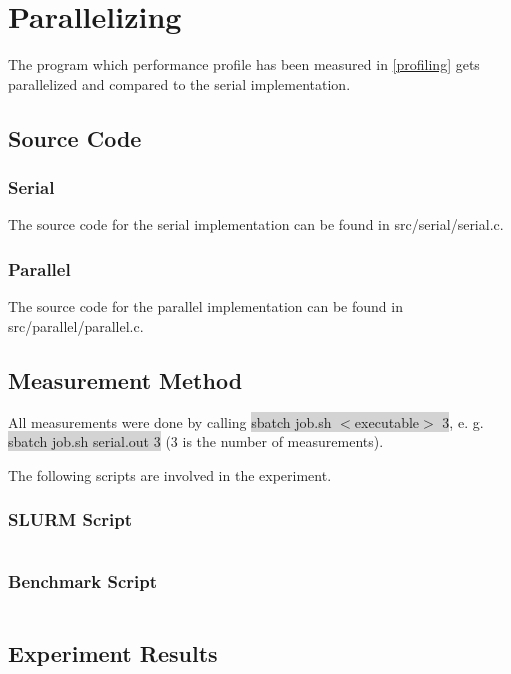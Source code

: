 \documentclass[parskip]{scrartcl}
\begin{document}
	\section{Parallelizing}
	The program which performance profile has been measured in \ref{profiling} gets parallelized and compared to the serial implementation.
	\subsection{Source Code}
	\subsubsection{Serial}
	The source code for the serial implementation can be found in src/serial/serial.c.
	\subsubsection{Parallel}
	The source code for the parallel implementation can be found in src/parallel/parallel.c.
	\subsection{Measurement Method}
	All measurements were done by calling \colorbox{lightgray}{sbatch job.sh $<$executable$>$ 3}, e. g. \colorbox{lightgray}{sbatch job.sh serial.out 3} (3 is the number of measurements).
	
	The following scripts are involved in the experiment.
	\subsubsection{SLURM Script}
	\inputminted[linenos,breaklines]{bash}{src/job.sh}
	\subsubsection{Benchmark Script}
	\inputminted[linenos,breaklines]{bash}{src/benchmark.sh}
	\subsection{Experiment Results}
\end{document}
